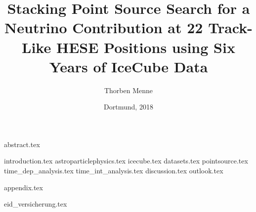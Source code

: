 

\usepackage{aas_macros}

\author{Thorben Menne}
\title{Stacking Point Source Search for a Neutrino Contribution at 22 Track-Like HESE Positions using Six Years of IceCube Data}
\date{Dortmund, 2018}

\titlehead{\texttt{[image: inc/tu-logo\_bw.pdf]}}






\frontmatter
\maketitle
\makecorrectorpage
{abstract.tex}

\tableofcontents

\mainmatter
{introduction.tex}
{astroparticlephysics.tex}
{icecube.tex}
{datasets.tex}
{pointsource.tex}
{time_dep_analysis.tex}
{time_int_analysis.tex}
{discussion.tex}
{outlook.tex}

\appendix
{appendix.tex}

\backmatter
\printbibliography

\renewcommand{\listfigurename}{List of figures}
\renewcommand{\listtablename}{List of tables}

\cleardoublepage
\listoffigures

\cleardoublepage
\listoftables

\cleardoublepage
{eid_versicherung.tex}



